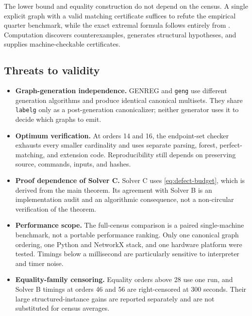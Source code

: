 \documentclass[smallextended,natbib,nospthms]{svjour3}
\theoremstyle{definition}
\theoremstyle{remark}
\begin{document}
The lower bound and equality construction do not depend on the census. A
single explicit graph with a valid matching certificate suffices to refute the
empirical quarter benchmark, while the exact extremal formula follows entirely
from . Computation discovers
counterexamples, generates structural hypotheses, and supplies
machine-checkable certificates.

\subsection{Threats to validity}

\begin{itemize}[leftmargin=1.5em]
  \item \textbf{Graph-generation independence.}
  GENREG and \texttt{geng} use different generation algorithms and produce
  identical canonical multisets. They share \texttt{labelg} only as a
  post-generation canonicalizer; neither generator uses it to decide which
  graphs to emit.

  \item \textbf{Optimum verification.}
  At orders 14 and 16, the endpoint-set checker exhausts every smaller
  cardinality and uses separate parsing, forest, perfect-matching, and
  extension code. Reproducibility still depends on preserving source,
  commands, inputs, and hashes.

  \item \textbf{Proof dependence of Solver C.}
  Solver C uses \eqref{eq:defect-budget}, which is derived from the main
  theorem. Its agreement with Solver B is an implementation audit and an
  algorithmic consequence, not a non-circular verification of the theorem.

  \item \textbf{Performance scope.}
  The full-census comparison is a paired single-machine benchmark, not a
  portable performance ranking. Only one canonical graph ordering, one Python
  and NetworkX stack, and one hardware platform were tested. Timings below a
  millisecond are particularly sensitive to interpreter and timer noise.

  \item \textbf{Equality-family censoring.}
  Equality orders above 28 use one run, and Solver B timings at orders 46 and
  56 are right-censored at 300 seconds. Their large structured-instance gains
  are reported separately and are not substituted for census averages.


\end{itemize}
\end{document}
